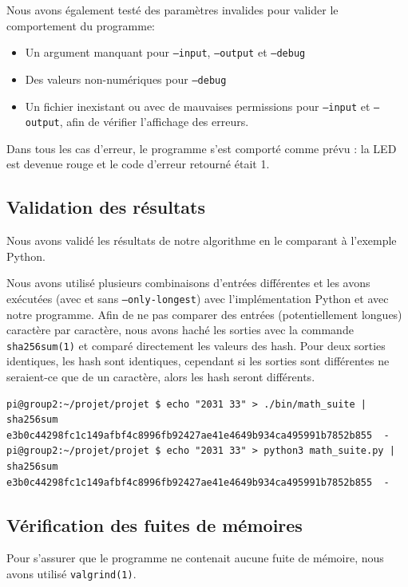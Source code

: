 \documentclass[a4paper,11pt]{article}
\begin{document}
Nous avons également testé des paramètres invalides pour valider le comportement du programme:

\begin{itemize}
    \item Un argument manquant pour \texttt{--input}, \texttt{--output} et \texttt{--debug}
    \item Des valeurs non-numériques pour \texttt{--debug}
    \item Un fichier inexistant ou avec de mauvaises permissions pour \texttt{--input} et \texttt{--output}, afin de vérifier l'affichage des erreurs.
\end{itemize}

Dans tous les cas d'erreur, le programme s'est comporté comme prévu : la LED est devenue rouge et le code d'erreur retourné était 1.

\subsection{Validation des résultats}

Nous avons validé les résultats de notre algorithme en le comparant à l'exemple Python.

Nous avons utilisé plusieurs combinaisons d'entrées différentes et les avons exécutées (avec et sans \texttt{--only-longest}) avec l'implémentation Python et avec notre programme. Afin de ne pas comparer des entrées (potentiellement longues) caractère par caractère, nous avons haché les sorties avec la commande \texttt{sha256sum(1)} et comparé directement les valeurs des hash. Pour deux sorties identiques, les hash sont identiques, cependant si les sorties sont différentes ne seraient-ce que de un caractère, alors les hash seront différents.

\begin{verbatim}
pi@group2:~/projet/projet $ echo "2031 33" > ./bin/math_suite | sha256sum
e3b0c44298fc1c149afbf4c8996fb92427ae41e4649b934ca495991b7852b855  -
pi@group2:~/projet/projet $ echo "2031 33" > python3 math_suite.py | sha256sum
e3b0c44298fc1c149afbf4c8996fb92427ae41e4649b934ca495991b7852b855  -
\end{verbatim}


\subsection{Vérification des fuites de mémoires}

Pour s'assurer que le programme ne contenait aucune fuite de mémoire, nous avons utilisé \texttt{valgrind(1)}.
\end{document}
